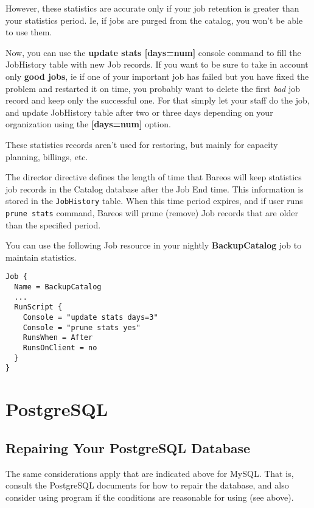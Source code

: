 However, these statistics are accurate only if your job retention is greater
than your statistics period. Ie, if jobs are purged from the catalog, you won't
be able to use them.

Now, you can use the \textbf{update stats [days=num]} console command to fill
the JobHistory table with new Job records. If you want to be sure to take in
account only \textbf{good jobs}, ie if one of your important job has failed but
you have fixed the problem and restarted it on time, you probably want to
delete the first \textit{bad} job record and keep only the successful one. For
that simply let your staff do the job, and update JobHistory table after two or
three days depending on your organization using the \textbf{[days=num]} option.

These statistics records aren't used for restoring, but mainly for
capacity planning, billings, etc.

The  director directive defines
the length of time that Bareos will keep statistics job records in the Catalog
database after the Job End time. This information is stored in the \texttt{JobHistory} table.
When this time
period expires, and if user runs \texttt{prune stats} command, Bareos will
prune (remove) Job records that are older than the specified period.

You can use the following Job resource in your nightly \textbf{BackupCatalog}
job to maintain statistics.
\begin{verbatim}
Job {
  Name = BackupCatalog
  ...
  RunScript {
    Console = "update stats days=3"
    Console = "prune stats yes"
    RunsWhen = After
    RunsOnClient = no
  }
}
\end{verbatim}


\section{PostgreSQL}

\label{RepairingPSQL}
\subsection{Repairing Your PostgreSQL Database}

The same considerations apply that are indicated above for MySQL. That is,
consult the PostgreSQL documents for how to repair the database, and also
consider using  program if the conditions are reasonable for
using (see above).

